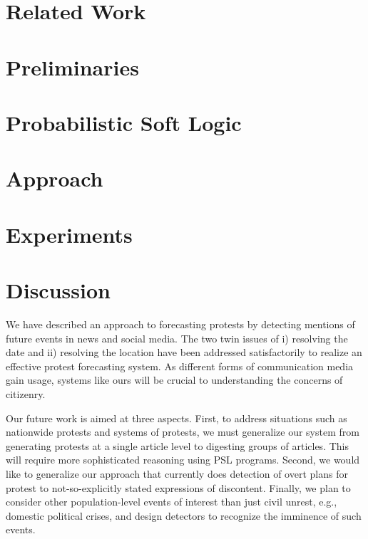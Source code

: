 \documentclass[letterpaper]{article}
\begin{document}
\vspace{3cm}
\vspace{3cm}
\vspace{3cm}
\vspace{3cm}
\vspace{3cm}
\begin{abstract}
\begin{quote}

\end{quote}
\end{abstract}
\label{intro}


\section{Related Work}


\section{Preliminaries}


\section{Probabilistic Soft Logic}

\label{section:PSL}

\section{Approach}


\section{Experiments}


\section{Discussion}
We have described an approach to forecasting protests by detecting mentions of future events in news and social
media. The two twin issues of i) resolving the date and ii) resolving the location have been addressed satisfactorily
to realize an effective protest forecasting system. As different forms of communication media gain usage, systems
like ours will be crucial to understanding the concerns of citizenry.

Our future work is aimed at three aspects. First, to address situations such as nationwide protests and systems of protests,
we must generalize our system from generating protests at a single article level to digesting groups of articles. This will
require more sophisticated reasoning using PSL programs. 
Second, we would like to generalize our approach that currently
does detection of overt plans for protest to not-so-explicitly stated expressions of discontent. 
Finally, we plan to consider other population-level events of interest than just civil unrest, e.g., domestic political crises,
and design detectors to recognize the imminence of such events.


 
\end{document}
